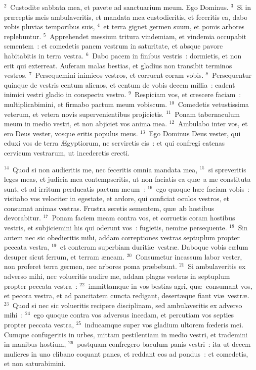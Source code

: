 ${}^{2}$~Custodite sabbata mea, et pavete ad sanctuarium meum. Ego Dominus.
${}^{3}$~Si in pr\ae ceptis meis ambulaveritis, et mandata mea custodieritis, et feceritis ea, dabo vobis pluvias temporibus suis,
${}^{4}$~et terra gignet germen suum, et pomis arbores replebuntur.
${}^{5}$~Apprehendet messium tritura vindemiam, et vindemia occupabit sementem~: et comedetis panem vestrum in saturitate, et absque pavore habitabitis in terra vestra.
${}^{6}$~Dabo pacem in finibus vestris~: dormietis, et non erit qui exterreat. Auferam malas bestias, et gladius non transibit terminos vestros.
${}^{7}$~Persequemini inimicos vestros, et corruent coram vobis.
${}^{8}$~Persequentur quinque de vestris centum alienos, et centum de vobis decem millia~: cadent inimici vestri gladio in conspectu vestro.
${}^{9}$~Respiciam vos, et crescere faciam~: multiplicabimini, et firmabo pactum meum vobiscum.
${}^{10}$~Comedetis vetustissima veterum, et vetera novis supervenientibus projicietis.
${}^{11}$~Ponam tabernaculum meum in medio vestri, et non abjiciet vos anima mea.
${}^{12}$~Ambulabo inter vos, et ero Deus vester, vosque eritis populus meus.
${}^{13}$~Ego Dominus Deus vester, qui eduxi vos de terra \AE gyptiorum, ne serviretis eis~: et qui confregi catenas cervicum vestrarum, ut incederetis erecti.


${}^{14}$~Quod si non audieritis me, nec feceritis omnia mandata mea,
${}^{15}$~si spreveritis leges meas, et judicia mea contempseritis, ut non faciatis ea qu\ae\ a me constituta sunt, et ad irritum perducatis pactum meum~:
${}^{16}$~ego quoque h\ae c faciam vobis~: visitabo vos velociter in egestate, et ardore, qui conficiat oculos vestros, et consumat animas vestras. Frustra seretis sementem, qu\ae\ ab hostibus devorabitur.
${}^{17}$~Ponam faciem meam contra vos, et corruetis coram hostibus vestris, et subjiciemini his qui oderunt vos~: fugietis, nemine persequente.
${}^{18}$~Sin autem nec sic obedieritis mihi, addam correptiones vestras septuplum propter peccata vestra,
${}^{19}$~et conteram superbiam duriti\ae\ vestr\ae . Daboque vobis c\ae lum desuper sicut ferrum, et terram \ae neam.
${}^{20}$~Consumetur incassum labor vester, non proferet terra germen, nec arbores poma pr\ae bebunt.
${}^{21}$~Si ambulaveritis ex adverso mihi, nec volueritis audire me, addam plagas vestras in septuplum propter peccata vestra~:
${}^{22}$~immittamque in vos bestias agri, qu\ae\ consumant vos, et pecora vestra, et ad paucitatem cuncta redigant, desert\ae que fiant vi\ae\ vestr\ae .
${}^{23}$~Quod si nec sic volueritis recipere disciplinam, sed ambulaveritis ex adverso mihi~:
${}^{24}$~ego quoque contra vos adversus incedam, et percutiam vos septies propter peccata vestra,
${}^{25}$~inducamque super vos gladium ultorem fœderis mei. Cumque confugeritis in urbes, mittam pestilentiam in medio vestri, et trademini in manibus hostium,
${}^{26}$~postquam confregero baculum panis vestri~: ita ut decem mulieres in uno clibano coquant panes, et reddant eos ad pondus~: et comedetis, et non saturabimini.


